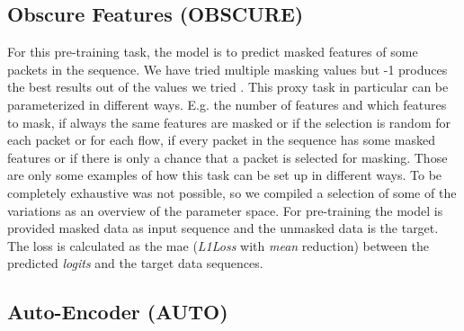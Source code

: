 \subsection{Obscure Features (OBSCURE)} \label{sec:experiments:lstm:mask_feature}

For this pre-training task, the model is to predict masked features of some packets in the sequence. We have tried multiple masking values but -1 produces the best results out of the values we tried . This proxy task in particular can be parameterized in different ways. E.g. the number of features and which features to mask, if always the same features are masked or if the selection is random for each packet or for each flow, if every packet in the sequence has some masked features or if there is only a chance that a packet is selected for masking. Those are only some examples of how this task can be set up in different ways. To be completely exhaustive was not possible, so we compiled a selection of some of the variations as an overview of the parameter space. For pre-training the model is provided masked data as input sequence and the unmasked data is the target. The loss is calculated as the \gls{mae} (\textit{L1Loss} with \textit{mean} reduction) between the predicted \textit{logits} and the target data sequences. 

\subsection{Auto-Encoder (AUTO)} \label{sec:experiments:lstm:auto_encoder}

